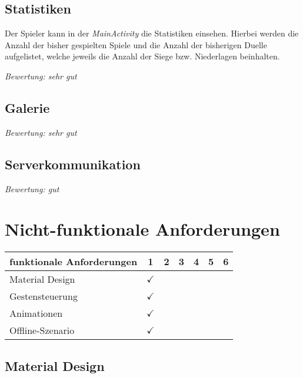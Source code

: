 \subsection{Statistiken}

Der Spieler kann in der \emph{MainActivity} die Statistiken einsehen. Hierbei werden die Anzahl der bisher gespielten Spiele und die Anzahl der bisherigen Duelle aufgelistet, welche jeweils die Anzahl der Siege bzw. Niederlagen beinhalten.

\vspace{5mm}
\emph{Bewertung: sehr gut}
\vspace{5mm}

\subsection{Galerie}

\vspace{5mm}
\emph{Bewertung: sehr gut}
\vspace{5mm}

\subsection{Serverkommunikation}

\vspace{5mm}
\emph{Bewertung: gut}
\vspace{5mm}

\section{Nicht-funktionale Anforderungen}
\label{sec:abgleich_nichtfunktionaleanforderungen}

\begin{table}[ht]
\centering
\begin{tabular}{l|c c c c c c}
funktionale Anforderungen & 1 & 2 & 3 & 4 & 5 & 6 \\ \hline\hline
Material Design & $\checkmark$ &  &  &  &  &   \\
Gestensteuerung & $\checkmark$ &  &  &  &  & \\
Animationen & $\checkmark$ &  &  &  &  & \\
Offline-Szenario & $\checkmark$ &  &  &  &  &
\end{tabular}
\label{tab:abgleich_nichtfunktionaleanforderungen}
\end{table}

\subsection{Material Design}

